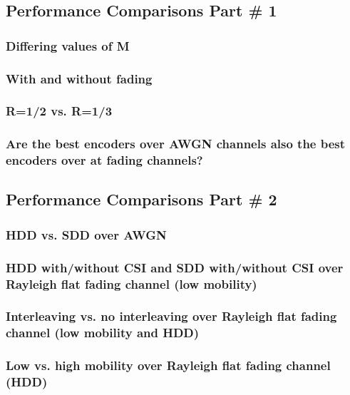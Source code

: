 \documentclass[a4paper,10pt]{article}
\begin{document}
\subsection{Performance Comparisons Part \# 1}

\subsubsection{Differing values of M}

\subsubsection{With and without fading}

\subsubsection{R=1/2 vs. R=1/3}

\subsubsection{Are the best encoders over AWGN channels also the best encoders over at fading
channels?}


\subsection{Performance Comparisons Part \# 2}

\subsubsection{HDD vs. SDD over AWGN}




\subsubsection{HDD with/without CSI and SDD with/without CSI over Rayleigh flat fading channel (low mobility)}


\subsubsection{Interleaving vs. no interleaving over Rayleigh flat fading channel (low mobility and HDD)}


\subsubsection{Low vs. high mobility over Rayleigh flat fading channel (HDD)}



\end{document}
